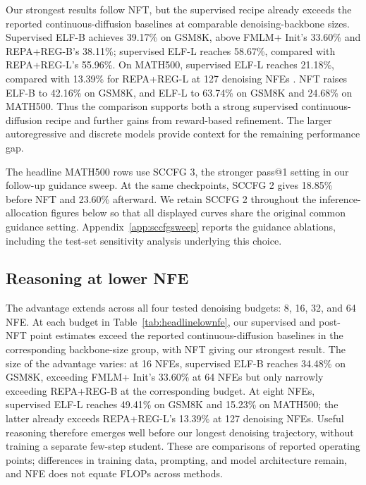 Our strongest results follow NFT, but the supervised recipe already exceeds the reported continuous-diffusion baselines at comparable denoising-backbone sizes. Supervised ELF-B achieves 39.17\% on GSM8K, above FMLM+ Init's 33.60\% and REPA+REG-B's 38.11\%; supervised ELF-L reaches 58.67\%, compared with REPA+REG-L's 55.96\%. On MATH500, supervised ELF-L reaches 21.18\%, compared with 13.39\% for REPA+REG-L at 127 denoising NFEs \citep{posterior,scalingdlm}. NFT raises ELF-B to 42.16\% on GSM8K, and ELF-L to 63.74\% on GSM8K and 24.68\% on MATH500. Thus the comparison supports both a strong supervised continuous-diffusion recipe and further gains from reward-based refinement. The larger autoregressive and discrete models provide context for the remaining performance gap.

The headline MATH500 rows use SCCFG 3, the stronger pass@1 setting in our follow-up guidance sweep. At the same checkpoints, SCCFG 2 gives 18.85\% before NFT and 23.60\% afterward. We retain SCCFG 2 throughout the inference-allocation figures below so that all displayed curves share the original common guidance setting. Appendix~\ref{app:sccfgsweep} reports the guidance ablations, including the test-set sensitivity analysis underlying this choice.

\subsection{Reasoning at lower NFE}
\label{sec:headlinelownfe}


The advantage extends across all four tested denoising budgets: 8, 16, 32, and 64 NFE. At each budget in Table~\ref{tab:headlinelownfe}, our supervised and post-NFT point estimates exceed the reported continuous-diffusion baselines in the corresponding backbone-size group, with NFT giving our strongest result. The size of the advantage varies: at 16 NFEs, supervised ELF-B reaches 34.48\% on GSM8K, exceeding FMLM+ Init's 33.60\% at 64 NFEs but only narrowly exceeding REPA+REG-B at the corresponding budget. At eight NFEs, supervised ELF-L reaches 49.41\% on GSM8K and 15.23\% on MATH500; the latter already exceeds REPA+REG-L's 13.39\% at 127 denoising NFEs. Useful reasoning therefore emerges well before our longest denoising trajectory, without training a separate few-step student. These are comparisons of reported operating points; differences in training data, prompting, and model architecture remain, and NFE does not equate FLOPs across methods.


